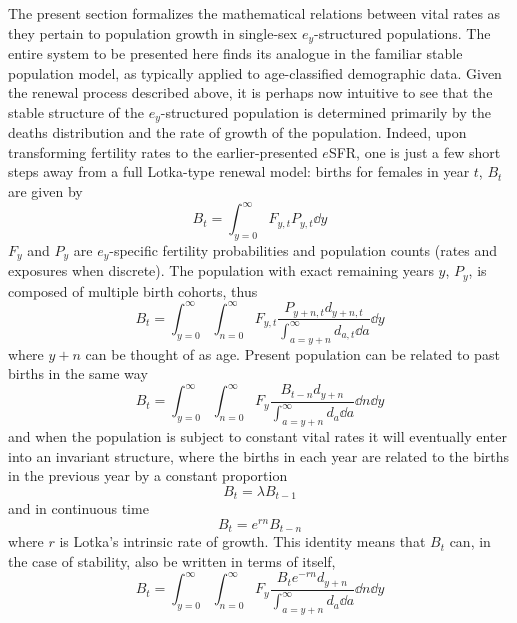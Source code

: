  \FloatBarrier
 \label{sec:ex2sexequation}
The present section formalizes the mathematical relations between vital
rates as they pertain to population growth in single-sex $e_y$-structured
populations. The entire system to be presented here finds its analogue in the
familiar stable population model, as typically applied to age-classified
demographic data. Given the renewal process described above, it is perhaps now
intuitive to see that the stable structure of the $e_y$-structured population is determined
primarily by the deaths distribution and the rate of growth of the
population. Indeed, upon transforming fertility rates to the earlier-presented
$e$SFR, one is just a few short steps away from a full Lotka-type renewal
model: births for females in year $t$, $B_{t}$ are given by
\begin{equation}
B_t = \int_{y=0}^\infty F_{y,t} P_{y,t} \dd y
\end{equation}
$F_y$ and $P_y$ are $e_y$-specific fertility probabilities and population
counts (rates and exposures when discrete). The population with
exact remaining years $y$, $P_y$, is composed of multiple birth cohorts, thus
\begin{equation}
B_t = \int_{y=0}^\infty \int_{n=0}^\infty F_{y,t}
\frac{P_{y+n,t}d_{y+n,t}}{\int_{a=y+n}^\infty d_{a,t} \dd a} \dd y
\end{equation}
where $y+n$ can be thought of as age. Present population can be related to past
births in the same way
\begin{equation}
B_t = \int_{y=0}^\infty \int_{n=0}^\infty F_y
\frac{B_{t-n}d_{y+n}}{\int_{a=y+n}^\infty d_a \dd a} \dd n \dd y
\end{equation}
and when the population is subject to constant vital rates it will eventually
enter into an invariant structure, where the births in each year are related to
the births in the previous year by a constant proportion
\begin{equation}
B_t = \lambda B_{t-1}
\end{equation}
and in continuous time
\begin{equation}
B_t = e^{rn}B_{t-n}
\end{equation}
where $r$ is Lotka's intrinsic rate of growth. This identity means that $B_t$
can, in the case of stability, also be written in terms of itself,
\begin{equation}
\label{eq:exrenewal1sex}
B_t = \int_{y=0}^\infty \int_{n=0}^\infty F_y
\frac{B_{t}e^{-rn}d_{y+n}}{\int_{a=y+n}^\infty d_a \dd a} \dd n \dd y
\end{equation}
